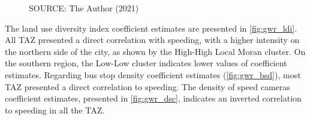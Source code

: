 \begin{figure}[!htbp]
\begin{subfigure}{0.5\textwidth}
    \end{subfigure}    
    \label{fig:gwr_dcsu}
    \par SOURCE: The Author (2021)
\end{figure}

The land use diversity index coefficient estimates are presented in \autoref{fig:gwr_ldi}. All TAZ presented a direct correlation with speeding, with a higher intensity on the northern side of the city, as shown by the High-High Local Moran cluster. On the southern region, the Low-Low cluster indicates lower values of coefficient estimates. Regarding bus stop density coefficient estimates (\autoref{fig:gwr_bsd}), most TAZ presented a direct correlation to speeding. The density of speed cameras coefficient estimates, presented in \autoref{fig:gwr_dsc}, indicates an inverted correlation to speeding in all the TAZ. 


